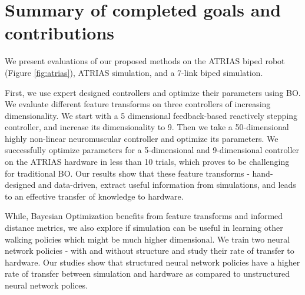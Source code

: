 \section{Summary of completed goals and contributions}

We present evaluations of our proposed methods on the ATRIAS biped robot (Figure \ref{fig:atrias}), ATRIAS simulation, and a 7-link biped simulation. 

First, we use expert designed controllers and optimize their parameters using BO. We evaluate different feature transforms on three  controllers of increasing dimensionality. We start with a 5 dimensional feedback-based reactively stepping controller, and increase its dimensionality to 9. Then we take a 50-dimensional highly non-linear neuromuscular controller and optimize its parameters. We successfully optimize parameters for a 5-dimensional and 9-dimensional controller on the ATRIAS hardware in less than 10 trials, which proves to be challenging for traditional BO. Our results show that these feature transforms - hand-designed and data-driven, extract useful information from simulations, and leads to an effective transfer of knowledge to hardware. 

While, Bayesian Optimization benefits from feature transforms and informed distance metrics, we also explore if simulation can be useful in learning other walking policies which might be much higher dimensional. We train two neural network policies - with and without structure and study their rate of transfer to hardware. Our studies show that structured neural network policies have a higher rate of transfer between simulation and hardware as compared to unstructured neural network polices.

